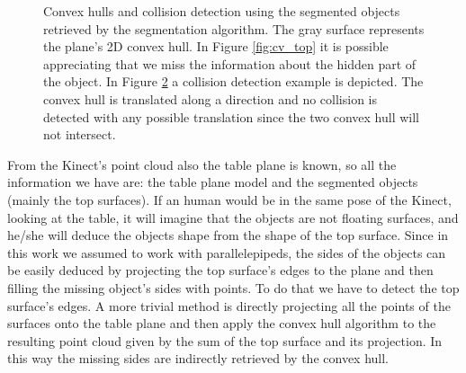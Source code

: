 \begin{figure}[h]
\begin{subfigure}[t]{0.3\textwidth}
\caption{}\label{fig:cv_top_collision}
\end{subfigure}
\caption{Convex hulls and collision detection using the segmented objects retrieved by the  segmentation algorithm. The gray surface represents the plane's 2D convex hull. In Figure \ref{fig:cv_top} it is possible appreciating that we miss the information about the hidden part of the object. In Figure \ref{fig:cv_top_collision} a collision detection example is depicted. The convex hull is translated along a direction and no collision is detected with any possible translation since the two convex hull will not intersect.}
\end{figure}

From the Kinect's point cloud also the table plane is known, so all the information we have are: the table plane model and the segmented objects (mainly the top surfaces).
If an human would be in the same pose of the Kinect, looking at the table, it will imagine that the objects are not floating surfaces, and he/she will deduce the objects shape from the shape of the top surface. Since in this work we assumed to work with parallelepipeds, the sides of the objects can be easily deduced by projecting the top surface's edges to the plane and then filling the missing object's sides with points. To do that we have to detect the top surface's edges. A more trivial method is directly projecting all the points of the surfaces onto the table plane and then apply the convex hull algorithm to the resulting point cloud given by the sum of the top surface and its projection. In this way the missing sides are indirectly retrieved by the convex hull. 


